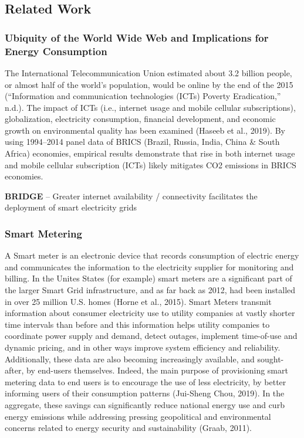 \documentclass[11pt,]{article}
\begin{document}
\hypertarget{related-work}{%
\subsection{Related Work}\label{related-work}}

\hypertarget{ubiquity-of-the-world-wide-web-and-implications-for-energy-consumption}{%
\subsubsection{Ubiquity of the World Wide Web and Implications for
Energy
Consumption}\label{ubiquity-of-the-world-wide-web-and-implications-for-energy-consumption}}

The International Telecommunication Union estimated about 3.2 billion
people, or almost half of the world's population, would be online by the
end of the 2015 (``Information and communication technologies (ICTs)
\textbar{} Poverty Eradication,'' n.d.). The impact of ICTs (i.e.,
internet usage and mobile cellular subscriptions), globalization,
electricity consumption, financial development, and economic growth on
environmental quality has been examined (Haseeb et al., 2019). By using
1994--2014 panel data of BRICS (Brazil, Russia, India, China \& South
Africa) economies, empirical results demonstrate that rise in both
internet usage and mobile cellular subscription (ICTs) likely mitigates
CO2 emissions in BRICS economies.

\textbf{BRIDGE} -- Greater internet availability / connectivity
facilitates the deployment of smart electricity grids

\hypertarget{smart-metering}{%
\subsubsection{Smart Metering}\label{smart-metering}}

A Smart meter is an electronic device that records consumption of
electric energy and communicates the information to the electricity
supplier for monitoring and billing. In the Unites States (for example)
smart meters are a significant part of the larger Smart Grid
infrastructure, and as far back as 2012, had been installed in over 25
million U.S. homes (Horne et al., 2015). Smart Meters transmit
information about consumer electricity use to utility companies at
vastly shorter time intervals than before and this information helps
utility companies to coordinate power supply and demand, detect outages,
implement time-of-use and dynamic pricing, and in other ways improve
system efficiency and reliability. Additionally, these data are also
becoming increasingly available, and sought-after, by end-users
themselves. Indeed, the main purpose of provisioning smart metering data
to end users is to encourage the use of less electricity, by better
informing users of their consumption patterns (Jui-Sheng Chou, 2019). In
the aggregate, these savings can significantly reduce national energy
use and curb energy emissions while addressing pressing geopolitical and
environmental concerns related to energy security and sustainability
(Graab, 2011).
\end{document}
